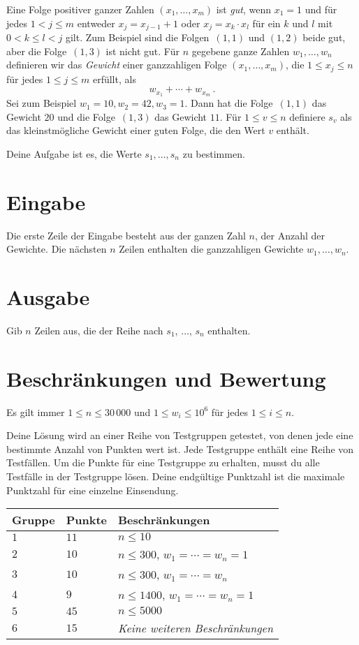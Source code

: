 
\noindent
Eine Folge positiver ganzer Zahlen $(x_1,\ldots,x_m)$ ist \emph{gut}, wenn $x_1 = 1$ und für jedes $1 < j \leq m$ entweder ${x_j=x_{j-1}+1}$ oder ${x_j=x_k\cdot x_l}$ für ein $k$ und $l$ mit $0< k\leq l< j$ gilt.
Zum Beispiel sind die Folgen~$(1,1)$ und $(1,2)$ beide gut, aber die Folge~$(1,3)$ ist nicht gut.
Für $n$ gegebene ganze Zahlen $w_1,\ldots,w_n$ definieren wir
das \emph{Gewicht} einer ganzzahligen Folge $(x_1,\ldots,x_m)$, die $1\leq x_j \leq n$ für jedes $1\leq j\leq m$ erfüllt, als
\[ w_{x_1} +\cdots +w_{x_m}\,.\] 
Sei zum Beispiel $w_1=10, w_2=42,w_3= 1$. Dann hat die Folge~$(1,1)$ das Gewicht $20$ und die Folge~$(1,3)$ das Gewicht $11$.
Für $1\leq v\leq n$ definiere $s_v$ als das kleinstmögliche Gewicht einer guten Folge, die den Wert $v$ enthält.

Deine Aufgabe ist es, die Werte $s_1,\ldots ,s_n$ zu bestimmen.

\section*{Eingabe}

Die erste Zeile der Eingabe besteht aus der ganzen Zahl $n$, der Anzahl der Gewichte.
Die nächsten $n$ Zeilen enthalten die ganzzahligen Gewichte $w_1, \ldots, w_n$.

\section*{Ausgabe}

Gib $n$ Zeilen aus, die der Reihe nach $s_1$, $\ldots$, $s_n$ enthalten.

\section*{Beschränkungen und Bewertung}

Es gilt immer
$1\leq n \leq 30\,000$ %
und
$1\leq w_i \leq 10^6$ für jedes $1\leq i \leq n$.%

Deine Lösung wird an einer Reihe von Testgruppen getestet, von denen jede eine bestimmte Anzahl von Punkten wert ist.
Jede Testgruppe enthält eine Reihe von Testfällen.
Um die Punkte für eine Testgruppe zu erhalten, musst du alle Testfälle in der Testgruppe lösen.
Deine endgültige Punktzahl ist die maximale Punktzahl für eine einzelne Einsendung.

\medskip
\begin{tabular}{lll}
Gruppe & Punkte & Beschränkungen \\\hline
$1$   & $11$ & $n\leq 10$ \\
$2$   & $10$ & $n\leq 300$, $w_1=\cdots=w_n = 1$ \\
$3$   & $10$ & $n\leq 300$, $w_1=\cdots=w_n$ \\ %
$4$   & $9$ & $n\leq 1400$, $w_1=\cdots=w_n = 1$ \\
$5$   & $45$ & $n\leq 5000$\\
$6$   & $15$ & \emph{Keine weiteren Beschränkungen}
\end{tabular}
